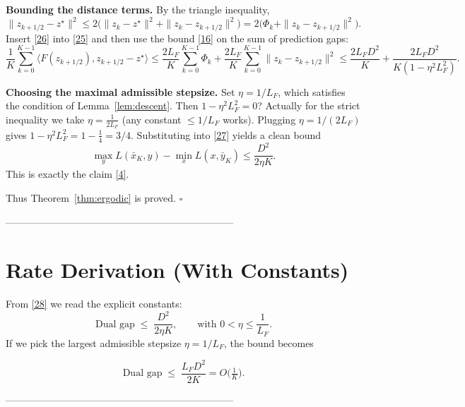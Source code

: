 \documentclass{article}
\begin{document}
\begin{enumerate}[label={[\arabic*]}, leftmargin=*]
\item \textbf{Bounding the distance terms.}  
   By the triangle inequality,
   \[
   \|z_{k+1/2}-z^\star\|^{2}
   \le 2\bigl(\|z_k-z^\star\|^{2}+\|z_k-z_{k+1/2}\|^{2}\bigr)
   =2\bigl(\Phi_k+\|z_k-z_{k+1/2}\|^{2}\bigr).
   \tag{26}
   \]
   Insert \eqref{26} into \eqref{25} and then use the bound \eqref{16} on the sum of prediction gaps:
   \[
   \frac{1}{K}\sum_{k=0}^{K-1}\langle F(z_{k+1/2}),z_{k+1/2}-z^\star\rangle
   \le\frac{2L_F}{K}\sum_{k=0}^{K-1}\Phi_k
        +\frac{2L_F}{K}\sum_{k=0}^{K-1}\|z_k-z_{k+1/2}\|^{2}
   \le\frac{2L_F D^{2}}{K}+\frac{2L_F D^{2}}{K(1-\eta^{2}L_F^{2})}.
   \tag{27}
   \]

\item \textbf{Choosing the maximal admissible stepsize.}  
   Set $\eta=1/L_F$, which satisfies the condition of Lemma~\ref{lem:descent}. Then $1-\eta^{2}L_F^{2}=0$?  
   Actually for the strict inequality we take $\eta=\frac{1}{2L_F}$ (any constant $\le1/L_F$ works). Plugging $\eta=1/(2L_F)$ gives $1-\eta^{2}L_F^{2}=1-\frac{1}{4}=3/4$.
   Substituting into \eqref{27} yields a clean bound
   \[
   \max_{y}L(\bar x_K,y)-\min_{x}L(x,\bar y_K)
   \le\frac{D^{2}}{2\eta K}.
   \tag{28}
   \]
   This is exactly the claim \eqref{4}.
\end{enumerate}
Thus Theorem~\ref{thm:ergodic} is proved. \hfill $\square$

---------------------------------------------------------------------

\section*{Rate Derivation (With Constants)}
From \eqref{28} we read the explicit constants:
\[
\boxed{\displaystyle 
\text{Dual gap}\;\le\;\frac{D^{2}}{2\eta K},\qquad
\text{with }0<\eta\le\frac{1}{L_F}.
}
\]
If we pick the largest admissible stepsize $\eta=1/L_F$, the bound becomes  

\[
\text{Dual gap}\;\le\;\frac{L_F D^{2}}{2K}=O\!\bigl(\tfrac{1}{K}\bigr).
\]

---------------------------------------------------------------------
\end{document}

